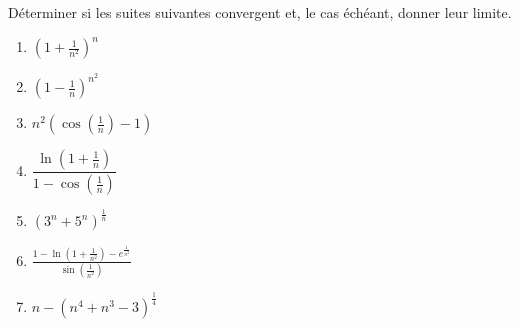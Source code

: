\documentclass[solutions]{exercices}
\begin{document}
\begin{exercice}[\di]
	Déterminer si les suites suivantes convergent et, le cas échéant, donner leur limite.
	\begin{multicols}{2}
		\newcommand{\elabel}{${\alph*}_n  =$}
		\begin{enumerate}[label=\elabel]
			\item $(1+\frac{1}{n^2})^{n}$
			\item $(1-\frac{1}{n})^{n^2}$
			\item $n^2(\cos(\frac1{n})-1)$
			\item $\dfrac{\ln(1+\frac1n)}{1-\cos(\frac1n)}$
			\item $(3^{n}+5^{n})^{\frac1n}$
			\item  ${\displaystyle \frac{1-\ln(1+\frac1{n^2})-e^{\frac{1}{n^2}}}{\sin(\frac{1}{n^2})}}$
			\item  ${\displaystyle n-(n^4+n^3-3)^{\frac14}}$
		\end{enumerate}
	\end{multicols}
\end{exercice}
\end{document}
